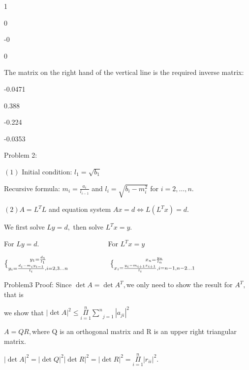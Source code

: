 \documentclass{article}
\begin{document}
1\qquad \TEXTsymbol{\vert}\qquad

0\qquad \TEXTsymbol{\vert}\qquad

-0\qquad \TEXTsymbol{\vert}\qquad

0\qquad \TEXTsymbol{\vert}\qquad

The matrix on the right hand of the vertical line is the required inverse
matrix:

-0.0471\qquad

0.388\qquad

-0.224\qquad

-0.0353\qquad

Problem 2:

$\left( 1\right) $ Initial condition: $l_{1}=\sqrt{b_{1}}$

Recursive formula:
$m_{i}=\frac{a_{i}}{l_{i-1}}$
and $l_{i}=\sqrt{b_{i}-m_{i}^{2}}$ for $i=2,\dots, n$.

$\left( 2\right) A=L^{T}L$ and equation
system $Ax=d\iff L\left(
L^{T}x\right) =d.$

We first solve $Ly=d,$ then solve $L^{T}x=y.$

For $Ly=d.\qquad \qquad \qquad \qquad \qquad $For $L^{T}x=y$

$\bigskip \QATOPD\{ . {y_{1}=\frac{d_{1}}{l_{1}}}{y_{i}=\frac{%
d_{i}-m_{i}y_{i-1}}{l_{i}},i=2,3...n}\qquad \qquad \qquad \QATOPD\{ . {x_{n}=%
\frac{y_{n}}{l_{n}}}{x_{i}=\frac{y_{i}-m_{i+1}x_{i+1}}{l_{i}},i=n-1,n-2...1}$


Problem3 Proof: Since $\det A=\det A^{T},$we only need to show the result
for $A^{T},$that is

we show that $\left\vert \det A\right\vert ^{2}\leq \underset{i=1}{\overset{n%
}{\Pi }}\underset{j=1}{\overset{n}{\sum }}\left\vert a_{ji}\right\vert ^{2}$

$A=QR,$where Q is an orthogonal matrix and R is an upper right triangular
matrix.

$\left\vert \det A\right\vert ^{2}=\left\vert \det Q\right\vert
^{2}\left\vert \det R\right\vert ^{2}=\left\vert \det R\right\vert ^{2}=%
\underset{i=1}{\overset{n}{\Pi }}\left\vert r_{ii}\right\vert ^{2}.$
\end{document}
